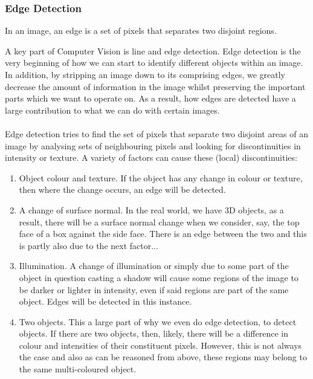 \documentclass[11pt]{article}
\begin{document}
\subsubsection{Edge Detection}

\begin{center}
	In an image, an edge is a set of pixels that separates two disjoint
	regions.
\end{center}

A key part of Computer Vision is line and edge detection. Edge detection is
the very beginning of how we can start to identify different objects 
within an image. In addition, by stripping an image down to its comprising
edges, we greatly decrease the amount of information in the image whilst
preserving the important parts which we want to operate on. 
As a result, how edges are detected have a large contribution
to what we can do with certain images.\\  
\\
Edge detection tries to find the set of pixels that separate two 
disjoint areas of an image by analysing sets of neighbouring pixels and 
looking for discontinuities in intensity or texture. A variety of factors
can cause these (local) discontinuities:
\begin{enumerate}
	\item Object colour and texture. If the object has any change in colour or
		  texture, then where the change occurs, an edge will be detected.
	\item A change of surface normal. In the real world, we have 3D objects,
		  as a result, there will be a surface normal change when we consider,
		  say, the top face of a box against the side face. There is an edge
		  between the two and this is partly also due to the next factor...
	\item Illumination. A change of illumination or simply due to some
		  part of the object in question casting a shadow will cause some regions
		  of the image to be darker or lighter in intensity, even if said
		  regions are part of the same object. Edges will be detected in this
		  instance.
	\item Two objects. This a large part of why we even do edge detection, to
		  detect objects. If there are two objects, then, likely, there will be
		  a difference in colour and intensities of their constituent pixels.
		  However, this is not always the case and also as can be reasoned from
		  above, these regions may belong to the same multi-coloured object.
\end{enumerate}
\end{document}
